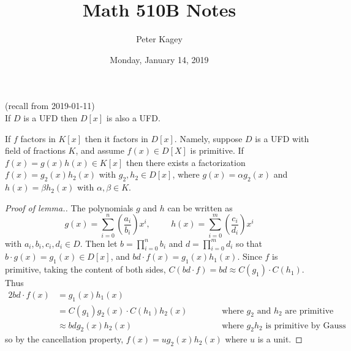 \documentclass{article}
\newenvironment{theorem}[1][Theorem.]{
  \begin{trivlist} \item[\hskip \labelsep {\bfseries #1}]
}{\end{trivlist}}
\newcommand{\paren}[1]{\left( #1 \right)}
\begin{document}
\title{Math 510B Notes}
\author{Peter Kagey}
\date{Monday, January 14, 2019}

\maketitle

\begin{theorem} (recall from 2019-01-11) \\
  If $D$ is a UFD then $D[x]$ is also a UFD.
\end{theorem}
\begin{theorem}[Lemma.]
  If $f$ factors in $K[x]$ then it factors in $D[x]$. Namely,
  suppose $D$ is a UFD with field of fractions $K$, and assume $f(x) \in D[X]$
  is primitive. If $f(x) = g(x)h(x) \in K[x]$ then there exists a factorization
  $f(x) = g_2(x)h_2(x)$ with $g_2, h_2 \in D[x]$, where $g(x) = \alpha g_2(x)$
  and $h(x) = \beta h_2(x)$ with $\alpha, \beta \in K$.
\end{theorem}
\begin{proof}[Proof of lemma.] The polynomials $g$ and $h$ can be written as \[
    g(x) = \sum_{i=0}^n \paren{\frac{a_i}{b_i}} x^i,
    \hspace{1cm}
    h(x) = \sum_{i=0}^m \paren{\frac{c_i}{d_i}} x^i
  \] with $a_i, b_i, c_i, d_i \in D$. Then let $b = \prod_{i=0}^n b_i$ and
  $d = \prod_{i=0}^m d_i$ so that $b\cdot g(x) = g_1(x) \in D[x]$, and
  $bd\cdot f(x) = g_1(x)h_1(x)$. Since $f$ is primitive, taking the content of
  both sides, $C(bd \cdot f) = bd \approx C(g_1)\cdot C(h_1)$.
  Thus \begin{alignat*}{2}
    bd\cdot f(x)
    &= g_1(x)h_1(x) && \\
    &= C(g_1)g_2(x)\cdot C(h_1)h_2(x) \hspace{1cm }&& \text{where $g_2$ and $h_2$ are primitive}\\
    &\approx bd g_2(x)h_2(x) && \text{where $g_2h_2$ is primitive by Gauss}
  \end{alignat*} so by the cancellation property, $f(x) = ug_2(x)h_2(x)$ where
  $u$ is a unit.
\end{proof}
\end{document}
